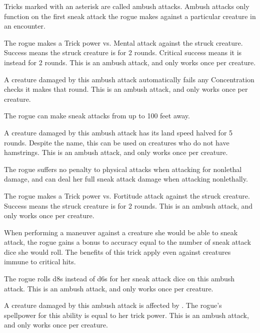         Tricks marked with an asterisk are called ambush attacks.
        Ambush attacks only function on the first sneak attack the rogue makes against a particular creature in an encounter.

        The rogue makes a Trick power vs. Mental attack against the struck creature.
        Success means the struck creature is \dazed for 2 rounds.
        Critical success means it is instead \confused for 2 rounds.
        This is an ambush attack, and only works once per creature.

        A creature damaged by this ambush attack automatically fails any Concentration checks it makes that round.
        This is an ambush attack, and only works once per creature.

        The rogue can make sneak attacks from up to 100 feet away.

        A creature damaged by this ambush attack has its land speed halved for 5 rounds.
        Despite the name, this can be used on creatures who do not have hamstrings.
        This is an ambush attack, and only works once per creature.

        The rogue suffers no penalty to physical attacks when attacking for nonlethal damage, and can deal her full sneak attack damage when attacking nonlethally.


        The rogue makes a Trick power vs. Fortitude attack against the struck creature.
        Success means the struck creature is \staggered for 2 rounds.
        This is an ambush attack, and only works once per creature.

        When performing a maneuver against a creature she would be able to sneak attack, the rogue gains a bonus to accuracy equal to the number of sneak attack dice she would roll.
        The benefits of this trick apply even against creatures immune to critical hits.

        The rogue rolls d8s instead of d6s for her sneak attack dice on this ambush attack.
        This is an ambush attack, and only works once per creature.

        A creature damaged by this ambush attack is affected by .
        The rogue's spellpower for this ability is equal to her trick power.
        This is an ambush attack, and only works once per creature.

